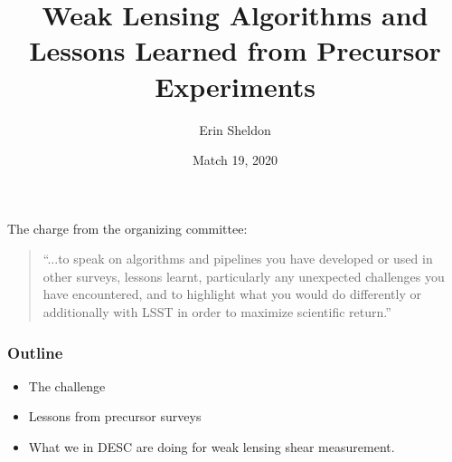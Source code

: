 \documentclass{beamer}
\title{Weak Lensing Algorithms and Lessons Learned from Precursor Experiments}
\author{Erin Sheldon}
\institute{Brookhaven National Laboratory}
\date{Match 19, 2020}
\begin{document}


\frame{\titlepage}

%
\frame
{


    {\huge The charge from the organizing committee: }
    \newline

    \begin{quote}
    ``...to speak on algorithms and pipelines you have developed or
    used in other surveys, lessons learnt, particularly any unexpected
    challenges you have encountered, and to highlight what you would do
    differently or additionally with LSST in order to maximize scientific
    return.''
    \end{quote}


}

\frame
{

    \frametitle{Outline}


    \begin{itemize}

        \item The challenge

        \item Lessons from precursor surveys

        \item What we in DESC are doing for weak lensing shear measurement.

    \end{itemize}

}
\end{document}
